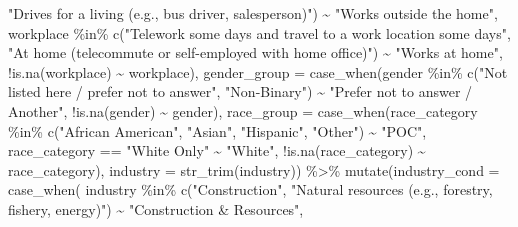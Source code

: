 \documentclass[
  12pt,
]{article}
\newenvironment{Shaded}{\begin{snugshade}}{\end{snugshade}}
\newcommand{\AttributeTok}[1]{\textcolor[rgb]{0.77,0.63,0.00}{#1}}
\newcommand{\FunctionTok}[1]{\textcolor[rgb]{0.00,0.00,0.00}{#1}}
\newcommand{\NormalTok}[1]{#1}
\newcommand{\SpecialCharTok}[1]{\textcolor[rgb]{0.00,0.00,0.00}{#1}}
\newcommand{\StringTok}[1]{\textcolor[rgb]{0.31,0.60,0.02}{#1}}
\begin{document}
\begin{Shaded}
\begin{Highlighting}[]
                                                           \StringTok{"Drives for a living (e.g., bus driver, salesperson)"}\NormalTok{)}
                                            \SpecialCharTok{\textasciitilde{}} \StringTok{"Works outside the home"}\NormalTok{,}
\NormalTok{                                          workplace }\SpecialCharTok{\%in\%} \FunctionTok{c}\NormalTok{(}\StringTok{"Telework some days and travel to a work location some days"}\NormalTok{,}
                                                           \StringTok{"At home (telecommute or self{-}employed with home office)"}\NormalTok{)}
                                            \SpecialCharTok{\textasciitilde{}} \StringTok{"Works at home"}\NormalTok{,}
                                          \SpecialCharTok{!}\FunctionTok{is.na}\NormalTok{(workplace) }\SpecialCharTok{\textasciitilde{}}\NormalTok{ workplace),}
             \AttributeTok{gender\_group =} \FunctionTok{case\_when}\NormalTok{(gender }\SpecialCharTok{\%in\%} \FunctionTok{c}\NormalTok{(}\StringTok{"Not listed here / prefer not to answer"}\NormalTok{, }\StringTok{"Non{-}Binary"}\NormalTok{)}
                                        \SpecialCharTok{\textasciitilde{}} \StringTok{"Prefer not to answer / Another"}\NormalTok{,}
                                      \SpecialCharTok{!}\FunctionTok{is.na}\NormalTok{(gender) }\SpecialCharTok{\textasciitilde{}}\NormalTok{ gender),}
             \AttributeTok{race\_group =} \FunctionTok{case\_when}\NormalTok{(race\_category }\SpecialCharTok{\%in\%} \FunctionTok{c}\NormalTok{(}\StringTok{"African American"}\NormalTok{, }\StringTok{"Asian"}\NormalTok{, }\StringTok{"Hispanic"}\NormalTok{, }\StringTok{"Other"}\NormalTok{) }\SpecialCharTok{\textasciitilde{}} \StringTok{"POC"}\NormalTok{,}
\NormalTok{                                    race\_category }\SpecialCharTok{==} \StringTok{"White Only"} \SpecialCharTok{\textasciitilde{}} \StringTok{"White"}\NormalTok{,}
                                    \SpecialCharTok{!}\FunctionTok{is.na}\NormalTok{(race\_category) }\SpecialCharTok{\textasciitilde{}}\NormalTok{ race\_category),}
             \AttributeTok{industry =} \FunctionTok{str\_trim}\NormalTok{(industry)) }\SpecialCharTok{\%\textgreater{}\%} 
      \FunctionTok{mutate}\NormalTok{(}\AttributeTok{industry\_cond =} \FunctionTok{case\_when}\NormalTok{(}
\NormalTok{        industry }\SpecialCharTok{\%in\%} \FunctionTok{c}\NormalTok{(}\StringTok{"Construction"}\NormalTok{, }\StringTok{"Natural resources (e.g., forestry, fishery, energy)"}\NormalTok{)}
          \SpecialCharTok{\textasciitilde{}} \StringTok{"Construction \& Resources"}\NormalTok{,}

\end{Highlighting}
\end{Shaded}
\end{document}
